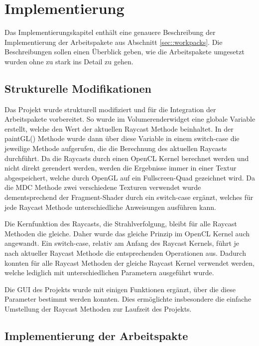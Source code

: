 \chapter{Implementierung}\label{chap::impl}
Das Implementierungskapitel enthält eine genauere Beschreibung der Implementierung der Arbeitspakete aus Abschnitt \ref{sec::workpacks}.
Die Beschreibungen sollen einen Überblick geben, wie die Arbeitspakete umgesetzt wurden ohne zu stark ins Detail zu gehen.

\section{Strukturelle Modifikationen}
Das Projekt wurde strukturell modifiziert und für die Integration der Arbeitspakete vorbereitet.
So wurde im Volumerenderwidget eine globale Variable erstellt, welche den Wert der aktuellen Raycast Methode beinhaltet.
In der paintGL() Methode wurde dann über diese Variable in einem switch-case die jeweilige Methode aufgerufen, die die Berechnung des aktuellen Raycasts durchführt.
Da die Raycasts durch einen OpenCL Kernel berechnet werden und nicht direkt gerendert werden, werden die Ergebnisse immer in einer Textur abgespeichert, welche durch OpenGL auf ein Fullscreen-Quad gezeichnet wird.
Da die MDC Methode zwei verschiedene Texturen verwendet wurde dementsprechend der Fragment-Shader durch ein switch-case ergänzt, welches für jede Raycast Methode unterschiedliche Anweisungen ausführen kann.

Die Kernfunktion des Raycasts, die Strahlverfolgung, bleibt für alle Raycast Methoden die gleiche.
Daher wurde das gleiche Prinzip im OpenCL Kernel auch angewandt.
Ein switch-case, relativ am Anfang des Raycast Kernels, führt je nach aktueller Raycast Methode die entsprechenden Operationen aus.
Dadurch konnten für alle Raycast Methoden der gleiche Raycast Kernel verwendet werden, welche lediglich mit unterschiedlichen Parametern ausgeführt wurde.

Die GUI des Projekts wurde mit einigen Funktionen ergänzt, über die diese Parameter bestimmt werden konnten.
Dies ermöglichte insbesondere die einfache Umstellung der Raycast Methoden zur Laufzeit des Projekts.

\section{Implementierung der Arbeitspakte}
